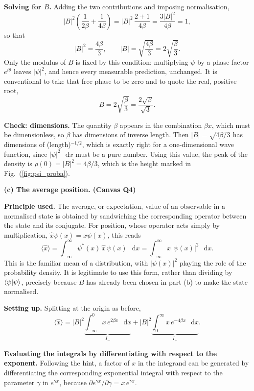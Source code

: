 \documentclass[12pt]{article}
\renewcommand{\d}{\mathop{}\!\mathrm{d}}
\newcommand{\problemsep}{\vspace{0.8em}}
\begin{document}
\begin{solutionbox}
\textbf{Solving for $B$.} Adding the two contributions and imposing normalisation,
\[
    |B|^{2}\left(\frac{1}{2\beta}+\frac{1}{4\beta}\right)
    =|B|^{2}\,\frac{2+1}{4\beta}
    =\frac{3|B|^{2}}{4\beta}=1 ,
\]
so that
\[
    |B|^{2}=\frac{4\beta}{3},
    \qquad
    |B|=\sqrt{\frac{4\beta}{3}}=2\sqrt{\frac{\beta}{3}} .
\]
Only the modulus of $B$ is fixed by this condition: multiplying $\psi$ by a phase factor $e^{i\theta}$ leaves $|\psi|^{2}$, and hence every measurable prediction, unchanged. It is conventional to take that free phase to be zero and to quote the real, positive root,
\[
    B=2\sqrt{\frac{\beta}{3}}=\frac{2\sqrt{\beta}}{\sqrt{3}} .
\]

\textbf{Check: dimensions.} The quantity $\beta$ appears in the combination $\beta x$, which must be dimensionless, so $\beta$ has dimensions of inverse length. Then $|B|=\sqrt{4\beta/3}$ has dimensions of (length)$^{-1/2}$, which is exactly right for a one-dimensional wave function, since $|\psi|^{2}\,\d x$ must be a pure number. Using this value, the peak of the density is $\rho(0)=|B|^{2}=4\beta/3$, which is the height marked in Fig.~(\ref{fig:psi_proba}).

\problemsep
\textbf{(c) The average position. \hfill (Canvas Q4)}

\textbf{Principle used.} The average, or expectation, value of an observable in a normalised state is obtained by sandwiching the corresponding operator between the state and its conjugate. For position, whose operator acts simply by multiplication, $\hat{x}\psi(x)=x\psi(x)$, this reads
\[
    \langle \hat{x}\rangle
    =\int_{-\infty}^{\infty}\psi^{*}(x)\,\hat{x}\,\psi(x)\,\d x
    =\int_{-\infty}^{\infty}x\,|\psi(x)|^{2}\,\d x .
\]
This is the familiar mean of a distribution, with $|\psi(x)|^{2}$ playing the role of the probability density. It is legitimate to use this form, rather than dividing by $\braket{\psi|\psi}$, precisely because $B$ has already been chosen in part (b) to make the state normalised.

\textbf{Setting up.} Splitting at the origin as before,
\[
    \langle \hat{x}\rangle
    =|B|^{2}\underbrace{\int_{-\infty}^{0}x\,e^{2\beta x}\,\d x}_{\textstyle I_{-}}
    +|B|^{2}\underbrace{\int_{0}^{\infty}x\,e^{-4\beta x}\,\d x}_{\textstyle I_{+}} .
\]

\textbf{Evaluating the integrals by differentiating with respect to the exponent.} Following the hint, a factor of $x$ in the integrand can be generated by differentiating the corresponding exponential integral with respect to the parameter $\gamma$ in $e^{\gamma x}$, because $\partial e^{\gamma x}/\partial\gamma=x\,e^{\gamma x}$.


\end{solutionbox}
\end{document}
